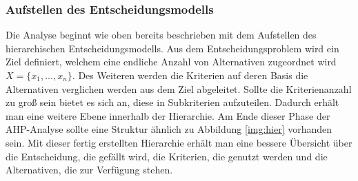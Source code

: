 \subsubsection{Aufstellen des Entscheidungsmodells}
Die Analyse beginnt wie oben bereits beschrieben mit dem Aufstellen des hierarchischen Entscheidungsmodells. Aus dem Entscheidungsproblem wird ein Ziel definiert, welchem eine endliche Anzahl von Alternativen zugeordnet wird $X=\{x_{1}, ..., x_{n}\}$\autocite[Vgl.][S.3]{Brunelli.2015}.
Des Weiteren werden die Kriterien auf deren Basis die Alternativen verglichen werden aus dem Ziel abgeleitet. Sollte die Kriterienanzahl zu groß sein bietet es sich an, diese in Subkriterien aufzuteilen. Dadurch erhält man eine weitere Ebene innerhalb der Hierarchie. Am Ende dieser Phase der AHP-Analyse sollte eine Struktur ähnlich zu Abbildung \ref{img:hier} vorhanden sein. Mit dieser fertig erstellten Hierarchie erhält man eine bessere Übersicht über die Entscheidung, die gefällt wird, die Kriterien, die genutzt werden und die Alternativen, die zur Verfügung stehen.\autocite[Vgl.][S.9]{Mu.2018} 
